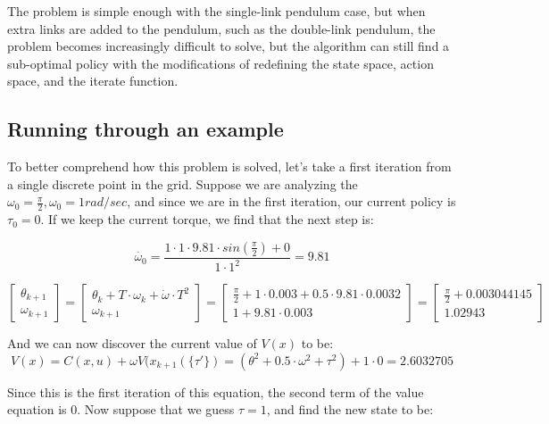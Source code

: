 \documentclass[12pt]{report}
\begin{document}
The problem is simple enough with the single-link pendulum case, but when extra links are added to the pendulum, such as the double-link pendulum, the problem becomes increasingly difficult to solve, but the algorithm can still find a sub-optimal policy with the modifications of redefining the state space, action space, and the iterate function.

\subsection{Running through an example}

To better comprehend how this problem is solved, let’s take a first iteration from a single discrete point in the grid. Suppose we are analyzing the $\omega_0=\frac{\pi}{2}, \omega_0=1 rad/sec$, and since we are in the first iteration, our current policy is $\tau_0=0$. If we keep the current torque, we find that the next step is:
	
\begin{equation} 
\dot{\omega_0} = \frac{1 \cdot 1 \cdot 9.81 \cdot sin(\frac{\pi}{2})+0}{1 \cdot 1^2} = 9.81
\end{equation}

\begin{equation} 
\begin{bmatrix}
\theta_{k+1} \\
\omega_{k+1}
\end{bmatrix}
=
\begin{bmatrix}
\theta_{k} + T \cdot \omega_{k} + \dot{\omega} \cdot T^2 \\
\omega_{k+1}
\end{bmatrix}
=
\begin{bmatrix}
\frac{\pi}{2}+1 \cdot 0.003 + 0.5 \cdot 9.81 \cdot 0.0032 \\
1 + 9.81 \cdot 0.003
\end{bmatrix}
=
\begin{bmatrix}
\frac{\pi}{2}+0.003044145 \\
1.02943
\end{bmatrix}
\end{equation}

And we can now discover the current value of $V(x)$ to be:
\begin{equation} 
V(x) = C(x,u) + \omega V(x_{k+1}(\{\tau'\})=(\theta^2+0.5 \cdot \omega^2 + \tau^2)+1 \cdot 0 = 2.6032705
\end{equation}

Since this is the first iteration of this equation, the second term of the value equation is 0. Now suppose that we guess $\tau=1$, and find the new state to be:
\end{document}

